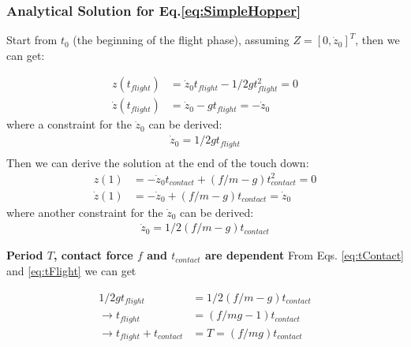 \subsubsection{Analytical Solution for Eq.\ref{eq:SimpleHopper}}
Start from $t_0$ (the beginning of the flight phase), assuming $Z = [0, \dot z_0]^T$, then we can get:

\begin{align}
z(t_{flight}) &= \dot z_0t_{flight} - 1/2gt^2_{flight} = 0\\
\dot z(t_{flight}) &= \dot z_0 - gt_{flight} = -\dot z_0
\end{align}
where a constraint for the $\dot z_0$ can be derived:
\begin{align}
\label{eq:tFlight}
\dot z_0 =  1/2gt_{flight}\\
\end{align}
Then we can derive the solution at the end of the touch down:
\begin{align}
z(1) &= -\dot z_0t_{contact} + (f/m -g)t_{contact}^2 = 0 \\
\dot z(1) &= -\dot z_0 + (f/m -g)t_{contact} = \dot z_0
\end{align}
where another constraint for the $\dot z_0$ can be derived:
\begin{align}
\label{eq:tContact}
\dot z_0 =  1/2(f/m-g)t_{contact}
\end{align}

\noindent \textbf{Period $T$, contact force $f$ and $t_{contact}$ are dependent }
From Eqs. \ref{eq:tContact} and \ref{eq:tFlight} we can get

\begin{align*}
1/2gt_{flight} &=  1/2(f/m-g)t_{contact}\\
\rightarrow t_{flight} &= (f/mg -1) t_{contact}\\
\rightarrow t_{flight} + t_{contact} &= T = (f/mg)t_{contact}
\end{align*}



\pagebreak
